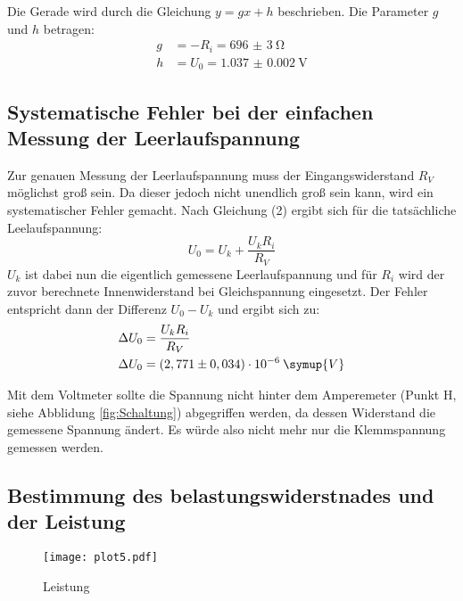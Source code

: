 Die Gerade wird durch die Gleichung $y = gx + h$ beschrieben. Die Parameter $g$ und $h$ betragen:
\begin{align*}
  g &= -R_i = \SI{696(3)}{\ohm}   \\
  h &= U_0 = \SI{1.037(2)}{\volt}
\end{align*}

\subsection{Systematische Fehler bei der einfachen Messung der Leerlaufspannung}
Zur genauen Messung der Leerlaufspannung muss der Eingangswiderstand $R_V$ möglichst groß sein.
Da dieser jedoch nicht unendlich groß sein kann, wird ein systematischer Fehler gemacht.
Nach Gleichung (2) ergibt sich für die tatsächliche Leelaufspannung:
\begin{equation*}
  U_0 = U_k + \frac{U_kR_i}{R_V}
\end{equation*}
$U_k$ ist dabei nun die eigentlich gemessene Leerlaufspannung und für $R_i$ wird
der zuvor berechnete Innenwiderstand bei Gleichspannung eingesetzt.
Der Fehler entspricht dann der Differenz $U_0 - U_k$ und ergibt sich zu:
\begin{align*}
  \Delta U_0 &= \frac{U_kR_i}{R_V} \\
  \Delta U_0 &= (2,771 \pm 0,034)\cdot 10^{-6} \: \symup{V}
\end{align*}

Mit dem Voltmeter sollte die Spannung nicht hinter dem Amperemeter (Punkt H, siehe Abblidung \ref{fig:Schaltung}) abgegriffen
werden, da dessen Widerstand die gemessene Spannung ändert. Es würde also nicht mehr nur die
Klemmspannung gemessen werden.




\subsection{Bestimmung des belastungswiderstnades und der Leistung}
\begin{figure}[H]
  \centering
  \texttt{[image: plot5.pdf]}
  \caption{Leistung}
  \label{fig:plot5}
\end{figure}
